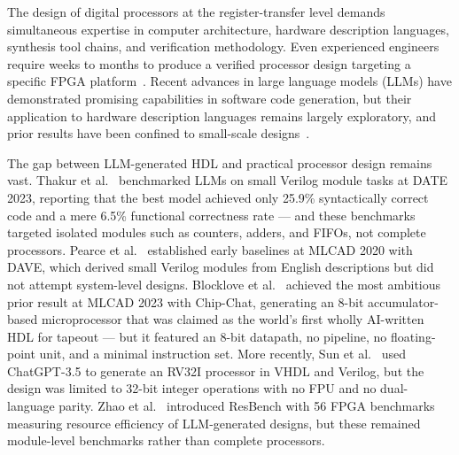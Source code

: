 \documentclass[conference]{IEEEtran}
\begin{document}
The design of digital processors at the register-transfer level demands simultaneous expertise in computer architecture, hardware description languages, synthesis tool chains, and verification methodology. Even experienced engineers require weeks to months to produce a verified processor design targeting a specific FPGA platform~\cite{patterson2017cod}. Recent advances in large language models (LLMs) have demonstrated promising capabilities in software code generation, but their application to hardware description languages remains largely exploratory, and prior results have been confined to small-scale designs~\cite{thakur2023date, blocklove2023chipchat, pearce2020dave, sun2024hdlgen, zhao2025resbench}.

The gap between LLM-generated HDL and practical processor design remains vast. Thakur et al.~\cite{thakur2023date} benchmarked LLMs on small Verilog module tasks at DATE 2023, reporting that the best model achieved only 25.9\% syntactically correct code and a mere 6.5\% functional correctness rate --- and these benchmarks targeted isolated modules such as counters, adders, and FIFOs, not complete processors. Pearce et al.~\cite{pearce2020dave} established early baselines at MLCAD 2020 with DAVE, which derived small Verilog modules from English descriptions but did not attempt system-level designs. Blocklove et al.~\cite{blocklove2023chipchat} achieved the most ambitious prior result at MLCAD 2023 with Chip-Chat, generating an 8-bit accumulator-based microprocessor that was claimed as the world's first wholly AI-written HDL for tapeout --- but it featured an 8-bit datapath, no pipeline, no floating-point unit, and a minimal instruction set. More recently, Sun et al.~\cite{sun2024hdlgen} used ChatGPT-3.5 to generate an RV32I processor in VHDL and Verilog, but the design was limited to 32-bit integer operations with no FPU and no dual-language parity. Zhao et al.~\cite{zhao2025resbench} introduced ResBench with 56 FPGA benchmarks measuring resource efficiency of LLM-generated designs, but these remained module-level benchmarks rather than complete processors.
\end{document}
